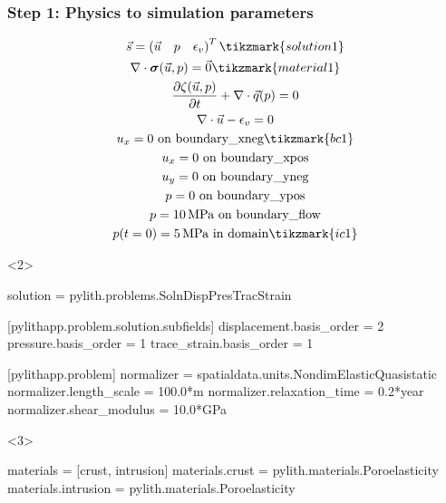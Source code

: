 \documentclass[aspectratio=169]{beamer}
\begin{document}
\begin{frame}[t,fragile]
  \frametitle{Step 1: Physics to simulation parameters}
  \summary{}

  \begin{minipage}[t]{0.3\textwidth}
    {\scriptsize
    \begin{gather*}
        \vec{s} = \left(\vec{u} \quad p \quad \epsilon_v\right)^T \tikzmark{solution1}\\
        \nabla \cdot \boldsymbol{\sigma}(\vec{u},p) = \vec{0} \tikzmark{material1}\\
        \frac{\partial \zeta(\vec{u},p)}{\partial t} + \nabla \cdot \vec{q}(p) = 0 \\
        \nabla \cdot \vec{u} - \epsilon_{v} = 0 \\
        u_x = 0 \text{ on boundary\_xneg} \tikzmark{bc1}\\
        u_x = 0 \text{ on boundary\_xpos} \\
        u_y = 0 \text{ on boundary\_yneg} \\
        p = 0 \text{ on boundary\_ypos} \\
        p = 10 \text{\,MPa on boundary\_flow} \\
        p(t=0) = 5 \text{\,MPa in domain} \tikzmark{ic1}
    \end{gather*}}
  \end{minipage}
  \hfill
  \begin{minipage}[t]{0.67\textwidth}
    \begin{onlyenv}<2>
      \begin{cfgcode}
        solution = pylith.problems.SolnDispPresTracStrain

        [pylithapp.problem.solution.subfields]
        displacement.basis_order = 2
        pressure.basis_order = 1
        trace_strain.basis_order = 1
        
        [pylithapp.problem]
        normalizer = spatialdata.units.NondimElasticQuasistatic
        normalizer.length_scale = 100.0*m
        normalizer.relaxation_time = 0.2*year
        normalizer.shear_modulus = 10.0*GPa
      \end{cfgcode}
    \end{onlyenv}
    \begin{onlyenv}<3>
      \begin{cfgcode}
        materials = [crust, intrusion]
        materials.crust = pylith.materials.Poroelasticity
        materials.intrusion = pylith.materials.Poroelasticity


\end{cfgcode}
\end{onlyenv}
\end{minipage}
\end{frame}
\end{document}
